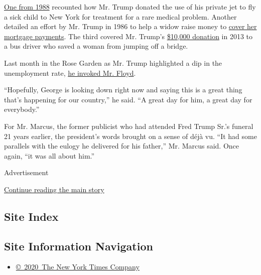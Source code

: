\href{https://www.jta.org/1988/07/20/archive/orthodox-child-with-rare-ailment-is-rescued-aboard-tycoons-jet}{One
from 1988} recounted how Mr. Trump donated the use of his private jet to
fly a sick child to New York for treatment for a rare medical problem.
Another detailed an effort by Mr. Trump in 1986 to help a widow raise
money to
\href{https://apnews.com/24c831825e0dab47d51d8d25bffe45f5}{cover her
mortgage payments}. The third covered Mr. Trump's
\href{https://www.aol.com/2013/11/08/trump-gift-barton-buffalo/}{\$10,000
donation} in 2013 to a bus driver who saved a woman from jumping off a
bridge.

Last month in the Rose Garden as Mr. Trump highlighted a dip in the
unemployment rate,
\href{https://www.nytimes3xbfgragh.onion/2020/06/05/us/politics/trump-jobs-report-george-floyd.html}{he
invoked Mr. Floyd}.

``Hopefully, George is looking down right now and saying this is a great
thing that's happening for our country,'' he said. ``A great day for
him, a great day for everybody.''

For Mr. Marcus, the former publicist who had attended Fred Trump Sr.'s
funeral 21 years earlier, the president's words brought on a sense of
déjà vu. ``It had some parallels with the eulogy he delivered for his
father,'' Mr. Marcus said. Once again, ``it was all about him.''

Advertisement

\protect\hyperlink{after-bottom}{Continue reading the main story}

\hypertarget{site-index}{%
\subsection{Site Index}\label{site-index}}

\hypertarget{site-information-navigation}{%
\subsection{Site Information
Navigation}\label{site-information-navigation}}

\begin{itemize}
\tightlist
\item
  \href{https://help.nytimes3xbfgragh.onion/hc/en-us/articles/115014792127-Copyright-notice}{©~2020~The
  New York Times Company}
\end{itemize}

